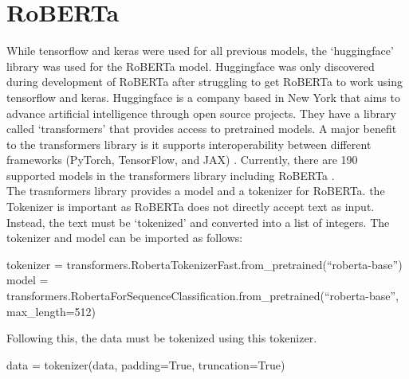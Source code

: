 \section{RoBERTa}
While tensorflow and keras were used for all previous models, the `huggingface' library was used for the RoBERTa model. Huggingface was only discovered
during development of RoBERTa after struggling to get RoBERTa to work using tensorflow and keras. Huggingface is a company based in New York that aims
to advance artificial intelligence through open source projects. They have a library called `transformers' \cite{transformers} that provides access
to pretrained models. A major benefit to the transformers library is it supports interoperability between different frameworks (PyTorch, TensorFlow, and JAX)
\cite{transformers}. Currently, there are 190 supported models in the transformers library including RoBERTa \cite{transformers}.\\
The trasnformers library provides a model and a tokenizer for RoBERTa. the Tokenizer is important as RoBERTa does not directly accept text as input. Instead,
the text must be `tokenized' and converted into a list of integers. The tokenizer and model can be imported as follows:
\begin{algorithm}
    \begin{algorithmic}
        \STATE tokenizer = transformers.RobertaTokenizerFast.from\_pretrained(``roberta-base'')
        \STATE model = transformers.RobertaForSequenceClassification.from\_pretrained(``roberta-base'', max\_length=512)
    \end{algorithmic}
\end{algorithm}

Following this, the data must be tokenized using this tokenizer.
\begin{algorithm}
    \begin{algorithmic}
        \STATE data = tokenizer(data, padding=True, truncation=True)
    \end{algorithmic}
\end{algorithm}

